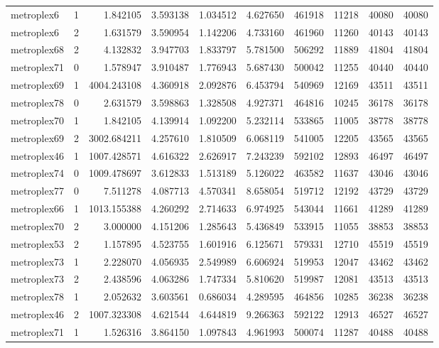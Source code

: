 \documentclass[../../../thesis.tex]{subfiles}
\begin{document}
\begin{longtable}{|l|r|r|r|r|r|r|r|r|r|}
metroplex6 & 1 & 1.842105 & 3.593138 & 1.034512 & 4.627650 & 461918 & 11218 & 40080 & 40080 \\
metroplex6 & 2 & 1.631579 & 3.590954 & 1.142206 & 4.733160 & 461960 & 11260 & 40143 & 40143 \\
metroplex68 & 2 & 4.132832 & 3.947703 & 1.833797 & 5.781500 & 506292 & 11889 & 41804 & 41804 \\
metroplex71 & 0 & 1.578947 & 3.910487 & 1.776943 & 5.687430 & 500042 & 11255 & 40440 & 40440 \\
metroplex69 & 1 & 4004.243108 & 4.360918 & 2.092876 & 6.453794 & 540969 & 12169 & 43511 & 43511 \\
metroplex78 & 0 & 2.631579 & 3.598863 & 1.328508 & 4.927371 & 464816 & 10245 & 36178 & 36178 \\
metroplex70 & 1 & 1.842105 & 4.139914 & 1.092200 & 5.232114 & 533865 & 11005 & 38778 & 38778 \\
metroplex69 & 2 & 3002.684211 & 4.257610 & 1.810509 & 6.068119 & 541005 & 12205 & 43565 & 43565 \\
metroplex46 & 1 & 1007.428571 & 4.616322 & 2.626917 & 7.243239 & 592102 & 12893 & 46497 & 46497 \\
metroplex74 & 0 & 1009.478697 & 3.612833 & 1.513189 & 5.126022 & 463582 & 11637 & 43046 & 43046 \\
metroplex77 & 0 & 7.511278 & 4.087713 & 4.570341 & 8.658054 & 519712 & 12192 & 43729 & 43729 \\
metroplex66 & 1 & 1013.155388 & 4.260292 & 2.714633 & 6.974925 & 543044 & 11661 & 41289 & 41289 \\
metroplex70 & 2 & 3.000000 & 4.151206 & 1.285643 & 5.436849 & 533915 & 11055 & 38853 & 38853 \\
metroplex53 & 2 & 1.157895 & 4.523755 & 1.601916 & 6.125671 & 579331 & 12710 & 45519 & 45519 \\
metroplex73 & 1 & 2.228070 & 4.056935 & 2.549989 & 6.606924 & 519953 & 12047 & 43462 & 43462 \\
metroplex73 & 2 & 2.438596 & 4.063286 & 1.747334 & 5.810620 & 519987 & 12081 & 43513 & 43513 \\
metroplex78 & 1 & 2.052632 & 3.603561 & 0.686034 & 4.289595 & 464856 & 10285 & 36238 & 36238 \\
metroplex46 & 2 & 1007.323308 & 4.621544 & 4.644819 & 9.266363 & 592122 & 12913 & 46527 & 46527 \\
metroplex71 & 1 & 1.526316 & 3.864150 & 1.097843 & 4.961993 & 500074 & 11287 & 40488 & 40488 \\

\end{longtable}
\end{document}
